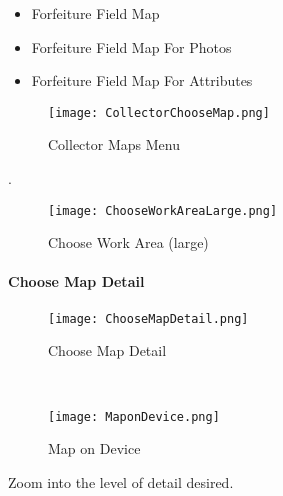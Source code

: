  \begin{itemize}
 \item Forfeiture Field Map
 \item Forfeiture Field Map For Photos
 \item Forfeiture Field Map For Attributes
 \end{itemize}

 \begin{wrapfigure}{r}{0.5\textwidth}
 \centering
     \texttt{[image: CollectorChooseMap.png]}
 \caption{Collector Maps Menu}
 \end{wrapfigure}
.
 \vspace{.5in}

 \vspace{1.75in}


 \clearpage
 \begin{wrapfigure}{r}{0.5\textwidth}
 \centering
     \texttt{[image: ChooseWorkAreaLarge.png]}
 \caption{Choose Work Area (large)}
 \end{wrapfigure}

 \vspace{1.5in}

 {\btn{} \lookArrow}
 \vspace{.2in}

 \clearpage
 \paragraph[Choose Map Detail]{Choose Map Detail\texorpdfstring{\\}{}}
 \begin{wrapfigure}{r}{0.5\textwidth}
 \centering
     \texttt{[image: ChooseMapDetail.png]}
 \caption{Choose Map Detail}
 \vspace{.25in}

 \HRule \\[.4cm] %
 \vspace{.25in}

     \texttt{[image: MaponDevice.png]}
 \caption{Map on Device}
 \end{wrapfigure}
 Zoom into the level of detail desired.
 \vspace{1in}

